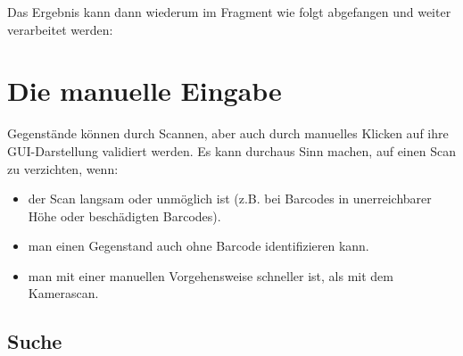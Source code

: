 Das Ergebnis kann dann wiederum im Fragment wie folgt abgefangen und
weiter verarbeitet werden:

\begin{Shaded}
\begin{Highlighting}[]
  \NormalTok{(}
    \NormalTok{) \{}
        \NormalTok{) \{}
            \NormalTok{(}\NormalTok{);}
\NormalTok{        \}}
\NormalTok{\}}
\end{Highlighting}
\end{Shaded}

\hypertarget{die-manuelle-eingabe}{%
\section{Die manuelle Eingabe}\label{die-manuelle-eingabe}}

Gegenstände können durch Scannen, aber auch durch manuelles Klicken auf
ihre GUI-Darstellung validiert werden. Es kann durchaus Sinn machen, auf
einen Scan zu verzichten, wenn:

\begin{itemize}
\tightlist
\item
  der Scan langsam oder unmöglich ist (z.B. bei Barcodes in
  unerreichbarer Höhe oder beschädigten Barcodes).
\item
  man einen Gegenstand auch ohne Barcode identifizieren kann.
\item
  man mit einer manuellen Vorgehensweise schneller ist, als mit dem
  Kamerascan.
\end{itemize}

\hypertarget{suche}{%
\subsection{Suche}\label{suche}}

